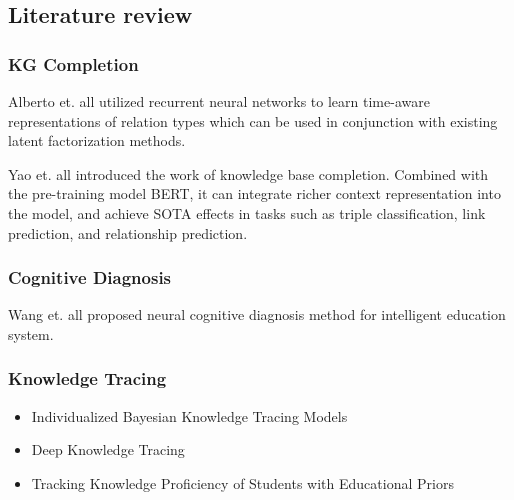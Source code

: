 \documentclass{beamer}
\begin{document}



\subsection{Literature review}
\begin{frame}
  \frametitle{KG Completion}
  Alberto et. all utilized recurrent neural networks to learn time-aware representations of relation types which
  can be used in conjunction with existing latent factorization methods.\cite{1}

  Yao et. all introduced the work of knowledge base completion. Combined with the pre-training model BERT, it can integrate richer context representation into the model, and achieve SOTA effects in tasks such as triple classification, link prediction, and relationship prediction.\cite{2}
\end{frame}

\begin{frame}
  \frametitle{Cognitive Diagnosis}
  Wang et. all proposed neural cognitive diagnosis method for intelligent education system. \cite{3}
\end{frame}

\begin{frame}
  \frametitle{Knowledge Tracing}
  \begin{itemize}
    \item Individualized Bayesian Knowledge Tracing Models\cite{4}
    \item Deep Knowledge Tracing\cite{5}
    \item Tracking Knowledge Proficiency of Students with Educational Priors\cite{6}
  \end{itemize} 
  \cite{3}
\end{frame}
\end{document}
